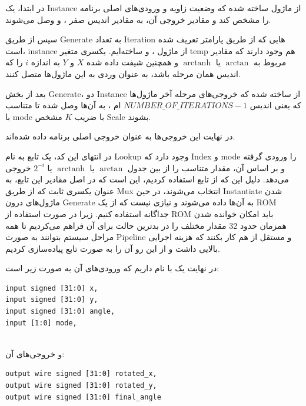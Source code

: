 \documentclass[12pt,titlepage,a4page , tikz , multi,table , svgnames,xcdraw]{article}
\DeclareMathOperator\arctanh{arctanh}
\begin{document}
در ابتدا، یک Instance از ماژول  ساخته شده که وضعیت زاویه و ورودی‌های اصلی برنامه را مشخص کند و مقادیر خروجی آن، به مقادیر اندیس صفر  ،  و  وصل می‌شوند.

سپس از طریق Generate به تعداد Iteration هایی که از طریق پارامتر تعریف شده است، instance از ماژول ،  و  ساخته‌ایم. یکسری متغیر temp هم وجود دارند که مقادیر مربوط به $\arctan$ یا $\arctanh$ و همچنین شیفت داده شده $X$ و $Y$ به اندازه $i$ را که اندیس همان مرحله باشد، به عنوان وردی به این ماژول‌ها متصل کنند.

بعد از بخش Generate، دو Instance از  ساخته شده که خروجی‌های مرحله آخر ماژول‌ها که یعنی اندیس
$NUMBER\_OF\_ITERATIONS - 1$
ام
 ،
   به آن‌ها وصل شده تا متناسب با mode با ضریب $K$ مشخص Scale بشوند.

در نهایت این خروجی‌ها به عنوان خروجی اصلی برنامه داده شده‌اند.

در انتهای این کد، یک تابع به نام Lookup وجود دارد که Index و mode را ورودی گرفته و بر اساس آن، مقدار متناسب را از بین جدول $\arctan$ یا $\arctanh$ یا $2^{-i}$ خروجی می‌دهد. دلیل این که از تابع استفاده کردیم، این است که در اصل مقادیر این تابع، به عنوان یکسری ثابت که از طریق Mux انتخاب می‌شوند، در حین Instantiate شدن ماژول‌های درون Generate به آن‌ها داده می‌شوند و نیازی نیست که از یک ROM جداگانه استفاده کنیم. زیرا در صورت استفاده از ROM باید امکان خوانده شدن همزمان حدود 32 مقدار مختلف را در بدترین حالت برای آن فراهم می‌کردیم تا همه مراحل سیستم بتوانند به صورت Pipeline و مستقل از هم کار بکنند که هزینه اجرایی بالایی داشت و از این رو آن را به صورت تابع پیاده‌سازی کردیم.


\hrulefill

\newpage
در نهایت یک  با نام  داریم که ورودی‌های آن به صورت زیر است:

\begin{latin}

\begin{verbatim}
input signed [31:0] x,
input signed [31:0] y,
input signed [31:0] angle,
input [1:0] mode,
   
\end{verbatim}

\end{latin}


و خروجی‌های آن:


\begin{latin}

\begin{verbatim}
output wire signed [31:0] rotated_x,
output wire signed [31:0] rotated_y,
output wire signed [31:0] final_angle
   
\end{verbatim}

\end{latin}
\end{document}
